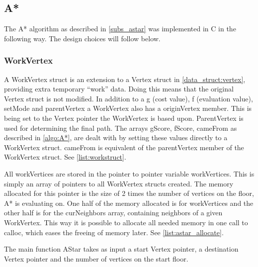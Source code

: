 \subsection{A*}


The A* algorithm as described in \cref{subs_astar} was implemented in C in the following way. The design choices will follow below.

\subsubsection{WorkVertex}



A WorkVertex struct is an extension to a Vertex struct in \cref{data_struct:vertex}, providing extra temporary \enquote{work} data. Doing this means that the original Vertex struct is not modified. In addition to a g (cost value), f (evaluation value), setMode and parentVertex a WorkVertex also has a originVertex member. This is being set to the Vertex pointer the WorkVertex is based upon. ParentVertex is used for determining the final path. The arrays gScore, fScore, cameFrom as described in \cref{algo:A*}, are dealt with by setting these values directly to a WorkVertex struct. cameFrom is equivalent of the parentVertex member of the WorkVertex struct. See \cref{list:workstruct}.







All workVertices are stored in the pointer to pointer variable workVertices. This is simply an array of pointers to all WorkVertex structs created. The memory allocated for this pointer is the size of 2 times the number of vertices on the floor, A* is evaluating on. One half of the memory allocated is for workVertices and the other half is for the curNeighbors array, containing neighbors of a given WorkVertex.  This way it is possible to allocate all needed memory in one call to calloc, which eases the freeing of memory later. See \cref{list:astar_allocate}.


The main function AStar takes as input a start Vertex pointer, a destination Vertex pointer and the number of vertices on the start floor.

